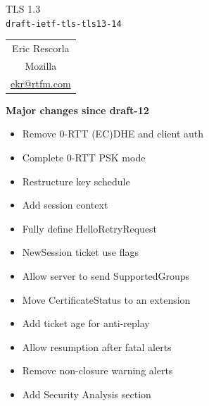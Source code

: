 \documentclass[helvetica]{seminar}
\newcommand{\heading}[1]{%
  \begin{center} 
    \large\bf 
    #1 
  \end{center} 
  \vspace{.4 in}}
\begin{document}
\begin{slide}
\begin{center}
\vspace{.5 in}
\LARGE{{\bf}TLS 1.3\\{\small \verb^draft-ietf-tls-tls13-14^}}\\
\vspace{.2in}
\large{
\begin{tabular}{c}
Eric Rescorla\\
Mozilla\\
\url{ekr@rtfm.com}
\end{tabular}
}
\end{center}
\end{slide}

\centerslidesfalse 

\begin{slide}
\heading{Major changes since draft-12}

\vspace{-8ex}
\begin{itemize}
\item Remove 0-RTT (EC)DHE and client auth
\item Complete 0-RTT PSK mode
\item Restructure key schedule
\item Add session context
\item Fully define HelloRetryRequest
\item NewSession ticket use flags
\item Allow server to send SupportedGroups
\item Move CertificateStatus to an extension
\item Add ticket age for anti-replay
\item Allow resumption after fatal alerts
\item Remove non-closure warning alerts
\item Add Security Analysis section
\end{itemize}

\end{slide}
\end{document}

